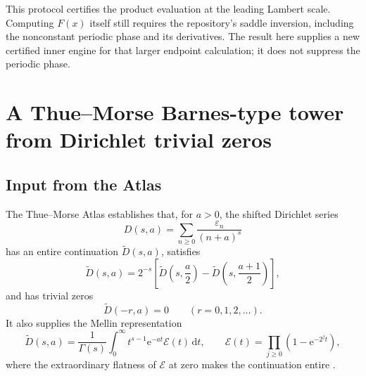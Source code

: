 \documentclass[11pt,oneside]{article}
\numberwithin{equation}{section}
\theoremstyle{definition}
\theoremstyle{remark}
\newcommand{\e}{\mathrm e}
\newcommand{\dd}{\,\mathrm d}
\newcommand{\eps}{\varepsilon}
\begin{document}
\begin{warning}
This protocol certifies the product evaluation at the leading Lambert scale.  Computing
$F(x)$ itself still requires the repository's saddle inversion, including the nonconstant
periodic phase and its derivatives.  The result here supplies a new certified inner engine
for that larger endpoint calculation; it does not suppress the periodic phase.
\end{warning}

\section{A Thue--Morse Barnes-type tower from Dirichlet trivial zeros}
\label{p2:sec:gamma-tower}

\subsection{Input from the Atlas}

The Thue--Morse Atlas establishes that, for $a>0$, the shifted Dirichlet series
\begin{equation}
 D(s,a)=\sum_{n\ge0}\frac{\eps_n}{(n+a)^s}
 \label{p2:eq:Dsa}
\end{equation}
has an entire continuation $\widetilde D(s,a)$, satisfies
\begin{equation}
 \widetilde D(s,a)=2^{-s}\left[
 \widetilde D\!\left(s,\frac a2\right)
 -\widetilde D\!\left(s,\frac{a+1}{2}\right)\right],
 \label{p2:eq:D-dyadic}
\end{equation}
and has trivial zeros
\begin{equation}
 \widetilde D(-r,a)=0\qquad(r=0,1,2,\ldots).
 \label{p2:eq:Dzeros}
\end{equation}
It also supplies the Mellin representation
\begin{equation}
 \widetilde D(s,a)=\frac1{\Gamma(s)}
 \int_0^\infty t^{s-1}\e^{-at}\mathcal E(t)\dd t,
 \qquad
 \mathcal E(t)=\prod_{j\ge0}(1-\e^{-2^jt}),
 \label{p2:eq:D-Mellin}
\end{equation}
where the extraordinary flatness of $\mathcal E$ at zero makes the continuation entire
\cite{p2:proveit-atlas,p2:toth2022}.
\end{document}
